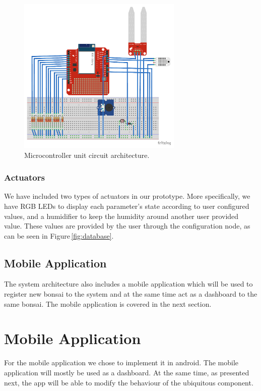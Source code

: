 \documentclass{article}
\begin{document}
\begin{figure}[!ht]
    \centering
    \includegraphics[width=0.7\textwidth]{figures/bmon_arch}
    \caption{Microcontroller unit circuit architecture.}
    \label{fig:architecture}
\end{figure}

\subsubsection{Actuators}
We have included two types of actuators in our prototype. More specifically, we
have RGB LEDs to display each parameter's state according to user configured
values, and a humidifier to keep the humidity around another user provided
value. These values are provided by the user through the configuration node, as
can be seen in Figure\,\ref{fig:database}.



\subsection{Mobile Application}
The system architecture also includes a mobile application which will be used to
register new bonsai to the system and at the same time act as a dashboard to the
same bonsai. The mobile application is covered in the next section.

\section{Mobile Application}\label{sec:mobile} For the mobile application we
chose to implement it in android. The mobile application will mostly be used as
a dashboard. At the same time, as presented next, the app will be able to modify
the behaviour of the ubiquitous component.
\end{document}
